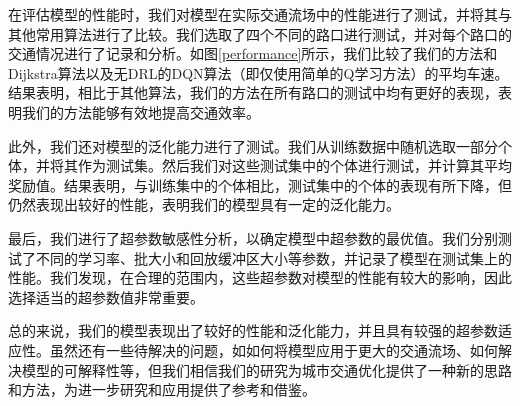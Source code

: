 在评估模型的性能时，我们对模型在实际交通流场中的性能进行了测试，并将其与其他常用算法进行了比较。我们选取了四个不同的路口进行测试，并对每个路口的交通情况进行了记录和分析。如图\ref{performance}所示，我们比较了我们的方法和Dijkstra算法以及无DRL的DQN算法（即仅使用简单的Q学习方法）的平均车速。结果表明，相比于其他算法，我们的方法在所有路口的测试中均有更好的表现，表明我们的方法能够有效地提高交通效率。

此外，我们还对模型的泛化能力进行了测试。我们从训练数据中随机选取一部分个体，并将其作为测试集。然后我们对这些测试集中的个体进行测试，并计算其平均奖励值。结果表明，与训练集中的个体相比，测试集中的个体的表现有所下降，但仍然表现出较好的性能，表明我们的模型具有一定的泛化能力。

最后，我们进行了超参数敏感性分析，以确定模型中超参数的最优值。我们分别测试了不同的学习率、批大小和回放缓冲区大小等参数，并记录了模型在测试集上的性能。我们发现，在合理的范围内，这些超参数对模型的性能有较大的影响，因此选择适当的超参数值非常重要。

总的来说，我们的模型表现出了较好的性能和泛化能力，并且具有较强的超参数适应性。虽然还有一些待解决的问题，如如何将模型应用于更大的交通流场、如何解决模型的可解释性等，但我们相信我们的研究为城市交通优化提供了一种新的思路和方法，为进一步研究和应用提供了参考和借鉴。
